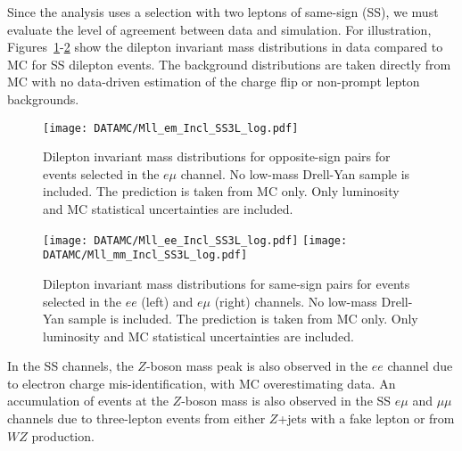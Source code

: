 Since the analysis uses a selection with two leptons of same-sign (SS), we must evaluate the level of agreement between data and simulation.
For illustration, Figures~\ref{fig:dataMC_2em.ss}-\ref{fig:dataMC_2ll.ss} show the dilepton invariant mass 
distributions in data compared to MC for SS dilepton events. 
The background distributions are taken directly from MC with no data-driven estimation of the charge flip or non-prompt lepton backgrounds.
\begin{figure}[htb!]
\centering
{\texttt{[image: DATAMC/Mll\_em\_Incl\_SS3L\_log.pdf]}}
\caption{Dilepton invariant mass distributions for opposite-sign pairs for events selected in the $e\mu$ channel. 
No low-mass Drell-Yan sample is included. 
 The prediction is taken from MC only.
Only luminosity and MC statistical uncertainties are included.
}
\label{fig:dataMC_2em.ss}
\end{figure}
\begin{figure}[htb!]
\centering
{\texttt{[image: DATAMC/Mll\_ee\_Incl\_SS3L\_log.pdf]}}
{\texttt{[image: DATAMC/Mll\_mm\_Incl\_SS3L\_log.pdf]}}
\caption{Dilepton invariant mass distributions for same-sign pairs for events selected in the $ee$ (left) and $e\mu$ (right) channels. 
No low-mass Drell-Yan sample is included. 
 The prediction is taken from MC only.
Only luminosity and MC statistical uncertainties are included.
}
\label{fig:dataMC_2ll.ss}
\end{figure}
In the SS channels, the $Z$-boson mass peak is also observed in the $ee$ channel due to electron charge mis-identification, with MC overestimating data. %
An accumulation of events at the $Z$-boson mass is also observed in the SS $e\mu$ and $\mu\mu$ channels due to three-lepton events 
from either $Z$+jets with a fake lepton or from $WZ$ production.  

